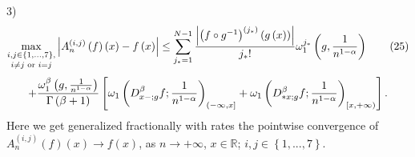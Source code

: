\documentclass[10pt]{NSP1}
\numberwithin{equation}{section}
\begin{document}
\begin{theorem}
3)
\begin{equation}
\underset{i\neq j\text{ or }i=j}{\underset{i,j\in \left \{ 1,...,7\right \} ,%
}{\max }}\left \vert A_{n}^{\left( i,j\right) }\left( f\right) \left(
x\right) -f\left( x\right) \right \vert \leq \sum_{j_{\ast }=1}^{N-1}\frac{%
\left \vert \left( f\circ g^{-1}\right) ^{\left( j_{\ast }\right) }\left(
g\left( x\right) \right) \right \vert }{j_{\ast }!}\omega _{1}^{j_{\ast
}}\left( g,\frac{1}{n^{1-\alpha }}\right)  \tag{25}  \label{25}
\end{equation}
\begin{equation*}
+\frac{\omega _{1}^{\beta }\left( g,\frac{1}{n^{1-\alpha }}\right) }{\Gamma
\left( \beta +1\right) }\left[ \omega _{1}\left( D_{x-;g}^{\beta }f;\frac{1}{%
n^{1-\alpha }}\right) _{(-\infty ,x]}+\omega _{1}\left( D_{\ast x;g}^{\beta
}f;\frac{1}{n^{1-\alpha }}\right) _{[x,+\infty )}\right] .
\end{equation*}
Here we get generalized fractionally with rates the pointwise convergence of
$A_{n}^{\left( i,j\right) }\left( f\right) \left( x\right) \rightarrow
f\left( x\right) $, as $n\rightarrow +\infty $, $x\in \mathbb{R}$; $i,j\in
\left \{ 1,...,7\right \} .$
\end{theorem}
\end{document}
